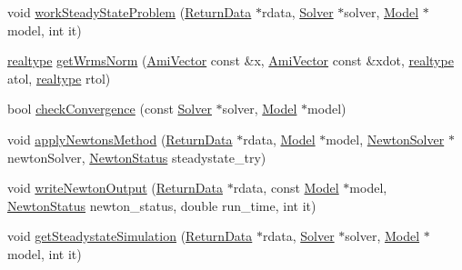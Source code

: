\begin{DoxyCompactItemize}
\item 
void \mbox{\hyperlink{classamici_1_1_steadystate_problem_aa2630b3401b8f0a50bf50c73d4f39790}{work\+Steady\+State\+Problem}} (\mbox{\hyperlink{classamici_1_1_return_data}{Return\+Data}} $\ast$rdata, \mbox{\hyperlink{classamici_1_1_solver}{Solver}} $\ast$solver, \mbox{\hyperlink{classamici_1_1_model}{Model}} $\ast$model, int it)
\item 
\mbox{\hyperlink{namespaceamici_a1bdce28051d6a53868f7ccbf5f2c14a3}{realtype}} \mbox{\hyperlink{classamici_1_1_steadystate_problem_afd3dce48510d1fce72b18049b40fff5a}{get\+Wrms\+Norm}} (\mbox{\hyperlink{classamici_1_1_ami_vector}{Ami\+Vector}} const \&x, \mbox{\hyperlink{classamici_1_1_ami_vector}{Ami\+Vector}} const \&xdot, \mbox{\hyperlink{namespaceamici_a1bdce28051d6a53868f7ccbf5f2c14a3}{realtype}} atol, \mbox{\hyperlink{namespaceamici_a1bdce28051d6a53868f7ccbf5f2c14a3}{realtype}} rtol)
\item 
bool \mbox{\hyperlink{classamici_1_1_steadystate_problem_a06f944df556560112e76a23213bf3f51}{check\+Convergence}} (const \mbox{\hyperlink{classamici_1_1_solver}{Solver}} $\ast$solver, \mbox{\hyperlink{classamici_1_1_model}{Model}} $\ast$model)
\item 
void \mbox{\hyperlink{classamici_1_1_steadystate_problem_a7b4c27de74a8185d0b454426601a187e}{apply\+Newtons\+Method}} (\mbox{\hyperlink{classamici_1_1_return_data}{Return\+Data}} $\ast$rdata, \mbox{\hyperlink{classamici_1_1_model}{Model}} $\ast$model, \mbox{\hyperlink{classamici_1_1_newton_solver}{Newton\+Solver}} $\ast$newton\+Solver, \mbox{\hyperlink{namespaceamici_a3fb34b6904b8b45827b51132977431da}{Newton\+Status}} steadystate\+\_\+try)
\item 
void \mbox{\hyperlink{classamici_1_1_steadystate_problem_a3dba8c3909bae68f98d6bf1bb82099da}{write\+Newton\+Output}} (\mbox{\hyperlink{classamici_1_1_return_data}{Return\+Data}} $\ast$rdata, const \mbox{\hyperlink{classamici_1_1_model}{Model}} $\ast$model, \mbox{\hyperlink{namespaceamici_a3fb34b6904b8b45827b51132977431da}{Newton\+Status}} newton\+\_\+status, double run\+\_\+time, int it)
\item 
void \mbox{\hyperlink{classamici_1_1_steadystate_problem_a7567ea97f4d840e7df61340b5129f4cd}{get\+Steadystate\+Simulation}} (\mbox{\hyperlink{classamici_1_1_return_data}{Return\+Data}} $\ast$rdata, \mbox{\hyperlink{classamici_1_1_solver}{Solver}} $\ast$solver, \mbox{\hyperlink{classamici_1_1_model}{Model}} $\ast$model, int it)
\item 

\end{DoxyCompactItemize}
